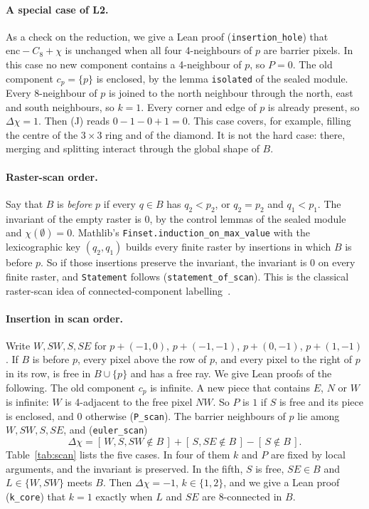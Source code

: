\documentclass[11pt]{article}
\theoremstyle{definition}
\theoremstyle{remark}
\begin{document}
\paragraph{A special case of L2.} As a check on the reduction, we give a Lean proof
(\texttt{insertion\_hole}) that $\mathrm{enc}-C_8+\chi$ is unchanged when all four
4-neighbours of $p$ are barrier pixels. In this case no new component contains a
4-neighbour of $p$, so $P=0$. The old component $c_p=\{p\}$ is enclosed, by the
lemma \texttt{isolated} of the sealed module. Every 8-neighbour of $p$ is joined to
the north neighbour through the north, east and south neighbours, so $k=1$. Every
corner and edge of $p$ is already present, so $\Delta\chi=1$. Then (J) reads
$0-1-0+1=0$. This case covers, for example, filling the centre of the $3\times3$
ring and of the diamond. It is not the hard case: there, merging and splitting
interact through the global shape of $B$.


\paragraph{Raster-scan order.} Say that $B$ is \emph{before} $p$ if every
$q\in B$ has $q_2<p_2$, or $q_2=p_2$ and $q_1<p_1$. The invariant of the empty
raster is $0$, by the control lemmas of the sealed module and $\chi(\emptyset)=0$.
Mathlib's \texttt{Finset.induction\_on\_max\_value} with the lexicographic key
$(q_2,q_1)$ builds every finite raster by insertions in which $B$ is before $p$. So
if those insertions preserve the invariant, the invariant is $0$ on every finite
raster, and \texttt{Statement} follows (\texttt{statement\_of\_scan}). This is the
classical raster-scan idea of connected-component labelling~\cite{RosenfeldPfaltz1966}.

\paragraph{Insertion in scan order.} Write $W,SW,S,SE$ for $p+(-1,0)$, $p+(-1,-1)$,
$p+(0,-1)$, $p+(1,-1)$. If $B$ is before $p$, every pixel above the row of $p$, and
every pixel to the right of $p$ in its row, is free in $B\cup\{p\}$ and has a free
ray. We give Lean proofs of the following. The old component $c_p$ is infinite. A
new piece that contains $E$, $N$ or $W$ is infinite: $W$ is 4-adjacent to the free
pixel $NW$. So $P$ is $1$ if $S$ is free and its piece is enclosed, and $0$ otherwise
(\texttt{P\_scan}). The barrier neighbours of $p$ lie among $W,SW,S,SE$, and
(\texttt{euler\_scan})
\[
  \Delta\chi = [\,W,S,SW\notin B\,] + [\,S,SE\notin B\,] - [\,S\notin B\,].
\]
Table~\ref{tab:scan} lists the five cases. In four of them $k$ and $P$ are fixed
by local arguments, and the invariant is preserved. In the fifth, $S$ is free,
$SE\in B$ and $L\in\{W,SW\}$ meets $B$. Then $\Delta\chi=-1$, $k\in\{1,2\}$, and we
give a Lean proof (\texttt{k\_core}) that $k=1$ exactly when $L$ and $SE$ are
8-connected in $B$.
\end{document}
